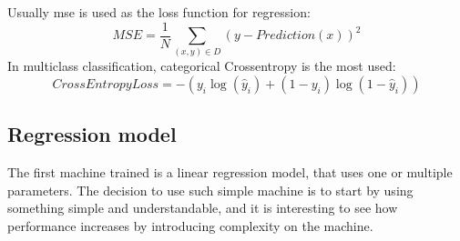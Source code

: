 Usually \gls{mse} is used as the loss function for regression:
\begin{equation}
    MSE=\frac{1}{N}\sum_{(x,y)\in D}\left(y-Prediction(x)\right)^2
\end{equation}
In multiclass classification, categorical Crossentropy is the most used:
\begin{equation}
    CrossEntropyLoss=-(y_i\log(\hat{y}_i)+(1-y_i)\log(1-\hat{y}_i))
\end{equation}
\subsection{Regression model}
The first machine trained is a linear regression model, that uses one or multiple parameters. The decision to use such simple machine is to start by using something simple and understandable, and it is interesting to see how performance increases by introducing complexity on the machine.
